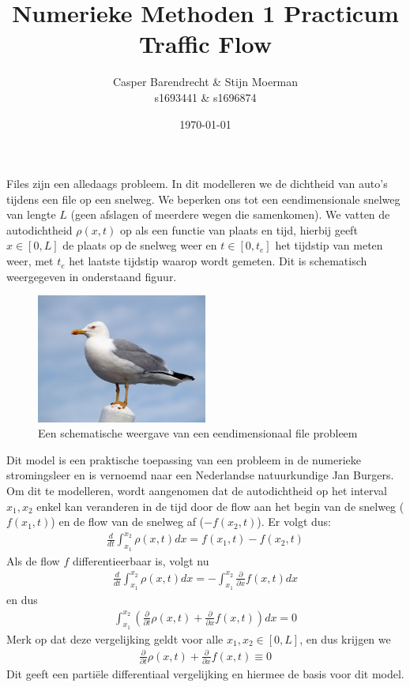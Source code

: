 \documentclass{article}
\title{Numerieke Methoden 1 Practicum Traffic Flow}
\author{Casper Barendrecht \& Stijn Moerman\\ s1693441 \& s1696874}
\date{\today}
\begin{document}
\maketitle

Files zijn een alledaags probleem. In dit modelleren we de dichtheid van auto's tijdens een file op een snelweg. We beperken ons tot een eendimensionale snelweg van lengte \(L\) (geen afslagen of meerdere wegen die samenkomen). 
We vatten de autodichtheid \(\rho(x,t)\) op als een functie van plaats en tijd, hierbij geeft \(x\in[0,L]\) de plaats op de snelweg weer en \(t\in[0,t_e]\) het tijdstip van meten weer, met \(t_e\) het laatste tijdstip waarop wordt gemeten. 
Dit is schematisch weergegeven in onderstaand figuur.

\begin{figure}[H]
  \centering
  \includegraphics[width=0.5\textwidth]{seagull}
  \caption{Een schematische weergave van een eendimensionaal file probleem}
  \label{fig:bots}
\end{figure}

Dit model is een praktische toepassing van een probleem in de numerieke stromingsleer en is vernoemd naar een Nederlandse natuurkundige Jan Burgers.
Om dit te modelleren, wordt aangenomen dat de autodichtheid op het interval \(x_1,x_2\) enkel kan veranderen in de tijd door de flow aan het begin van de snelweg (\(f(x_1,t)\)) en de flow van de snelweg af  (\(-f(x_2,t)\)). 
Er volgt dus:
\begin{align*}
\frac{d}{dt}\int_{x_1}^{x_2}\rho(x,t)dx=f(x_1,t)-f(x_2,t)
\end{align*}
Als de flow \(f\) differentieerbaar is, volgt nu
\begin{align*}
	\frac{d}{dt}\int_{x_1}^{x_2}\rho(x,t)dx = -\int_{x_1}^{x_2}\frac{\partial}{\partial x}f(x,t)dx
\end{align*}
en dus
\begin{align}
	\int_{x_1}^{x_2}\left(\frac{\partial}{\partial t}\rho(x,t)+\frac{\partial}{\partial x}f(x,t)\right)dx=0
\end{align}
Merk op dat deze vergelijking geldt voor alle \(x_1,x_2\in[0,L]\), en dus krijgen we 
\begin{align*}
	\frac{\partial}{\partial t}\rho(x,t)+\frac{\partial}{\partial x}f(x,t) \equiv 0
\end{align*}
Dit geeft een parti\"ele differentiaal vergelijking en hiermee de basis voor dit model.
\end{document}

